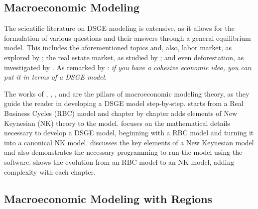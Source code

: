 \documentclass[
	thesis.tex
	]{subfiles}
\begin{document}
	\subsection*{Macroeconomic Modeling}
	
	The scientific literature on DSGE modeling is extensive, as it allows for the formulation of various questions and their answers through a general equilibrium model. This includes the aforementioned topics and, also, labor market, as explored by \textcite{ribeiro_alongamento_2023}; the real estate market, as studied by \textcite{albuquerquemello_mercado_2018}; and even deforestation, as investigated by \textcite{pereira_desmatamento_2013}. As remarked by \textcite{solis-garcia_ucb_2022}: \textit{if you have a cohesive economic idea, you can put it in terms of a DSGE model}. %
	
	The works of \textcite{costa_junior_understanding_2016}, \textcite{solis-garcia_ucb_2022}, \textcite{bergholt_basic_2012}, and \textcite{gali_monetary_2015} are the pillars of macroeconomic modeling theory, as they guide the reader in developing a DSGE model step-by-step. \textcite{costa_junior_understanding_2016} starts from a Real Business Cycles (RBC) model and chapter by chapter adds elements of New Keynesian (NK) theory to the model. \textcite{solis-garcia_ucb_2022} focuses on the mathematical details necessary to develop a DSGE model, beginning with a RBC model and turning it into a canonical NK model. \textcite{bergholt_basic_2012} discusses the key elements of a New Keynesian model and also demonstrates the necessary programming to run the model using the \dynare{} software. \textcite{gali_monetary_2015} shows the evolution from an RBC model to an NK model, adding complexity with each chapter.
	
	
	\subsection*{Macroeconomic Modeling with Regions}
	
	
\end{document}
